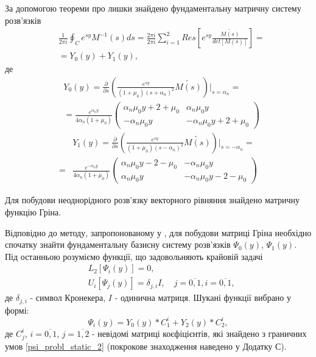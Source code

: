 За допомогою теореми про лишки знайдено фундаментальну матричну систему розв'язків
\begin{align*}
    &\frac{1}{2\pi i} \oint_C e^{sy} M^{-1}(s)ds = \frac{2 \pi i}{2 \pi i} \sum_{i=1}^{2} Res\left[ e^{sy} \frac{\widetilde{M(s)}}{det[M(s)]} \right] = \\
    & =Y_0(y) + Y_1(y),
\end{align*}
де
\begin{align}
    &Y_0(y) =  \frac{\partial}{\partial s} \left( \frac{e^{sy}}{(1 + \mu_0)(s+\alpha_n)^2} \widetilde{M(s)} \right) \Big|_{s=\alpha_n} = \nonumber \\
    &=\frac{e^{\alpha_n y}}{4\alpha_n(1 + \mu_0)} \begin{pmatrix}
    \alpha_n \mu_0 y + 2 + \mu_0 & \alpha_n \mu_0 y \\
    -\alpha_n \mu_0 y & -\alpha_n \mu_0 y + 2 + \mu_0
    \end{pmatrix}
\end{align}
\begin{align}
    &Y_1(y) = \frac{\partial}{\partial s} \left(\frac{e^{sy}}{(1 + \mu_0)(s-\alpha_n)^2} \widetilde{M(s)} \right) \Big|_{s=-\alpha_n} = \nonumber \\
    =&\frac{e^{-\alpha_n y}}{4\alpha_n(1 + \mu_0)} \begin{pmatrix}
    \alpha_n \mu_0 y - 2 - \mu_0 & -\alpha_n \mu_0 y \\
    \alpha_n \mu_0 y & -\alpha_n \mu_0 y - 2 - \mu_0
    \end{pmatrix}
\end{align}

Для побудови неоднорідного розв'язку векторного рівняння знайдено матричну функцію Гріна.

Відповідно до методу, запропонованому у \cite{popov_2}, для побудови матриці Гріна необхідно спочатку знайти фундаментальну базисну систему розв'язків $\Psi_0(y)$, $\Psi_1(y)$.
Під останньою розуміємо функції, що задовольняють крайовій задачі
\begin{align}\label{psi_probl_static_2}
    &L_2\left[ \Psi_i(y) \right] = 0, \nonumber \\
    &U_i\left[ \Psi_j(y) \right] = \delta_{j,i}I, \quad j= \overline{0, 1}, i= \overline{0, 1},
\end{align}
де $\delta_{j,i}$ - символ Кронекера, $I$ - одинична матриця.
Шукані функції вибрано у формі:
\begin{equation}\label{psi_static_2}
    \Psi_i(y) = Y_0(y) * C_1^i + Y_2(y) * C_2^i,
\end{equation}
де $C_j^i$, $i=\overline{0, 1}$, $j=\overline{1, 2}$ - невідомі матриці коєфіцієнтів, які знайдено з граничних умов \eqref{psi_probl_static_2}
(покрокове знаходження наведено у Додатку С).

